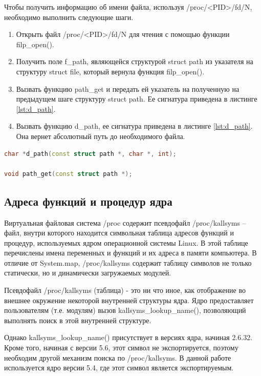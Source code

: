 \documentclass[a4paper,14pt]{article}
\begin{document}
Чтобы получить информацию об имени файла, используя /proc/<PID>/fd/N, необходимо выполнить следующие шаги.

\begin{enumerate}
	\item Открыть файл /proc/<PID>/fd/N для чтения с помощью функции filp\_open().
	\item Получить поле f\_path, являющейся структурой struct path из указателя на структуру struct file, который вернула функция filp\_open().
	\item Вызвать функцию path\_get и передать ей указатель на полученную на предыдущем шаге структуру struct path. Ее сигнатура приведена в листинге \ref{lst:d_path}.
	\item Вызвать функцию d\_path, ее сигнатура приведена в листинге \ref{lst:d_path}. Она вернет абсолютный путь до необходимого файла. 
\end{enumerate}

\begin{lstlisting}[language=C++,label={lst:d_path}, caption=\text{d\_path() и path\_get() для ядра версии 5.4.}]
char *d_path(const struct path *, char *, int);

void path_get(const struct path *);
\end{lstlisting}


\subsection{Адреса функций и процедур ядра}

Виртуальная файловая система /proc содержит псевдофайл /proc/kallsyms -- файл, внутри которого находится символьная таблица адресов функций и процедур, используемых ядром операционной системы Linux. В этой таблице перечислены имена переменных и функций и их адреса в памяти компьютера. В отличие от System.map, /proc/kallsyms содержит таблицу символов не только статически, но и динамически загружаемых модулей.

Псевдофайл /proc/kallsyms (таблица) - это ни что иное, как отображение во внешнее окружение некоторой внутренней структуры ядра. Ядро предоставляет пользователям (т.е. модулям) вызов kallsyms\_lookup\_name(), позволяющий выполнять поиск в этой внутренней структуре.

Однако kallsyms\_lookup\_name() присутствует в версиях ядра, начиная 2.6.32. Кроме того, начиная с версии 5.6, этот символ не экспортируется, поэтому необходим другой механизм поиска по /proc/kallsyms. В данной работе используется ядро версии 5.4, где этот символ является экспортируемым.
\end{document}
